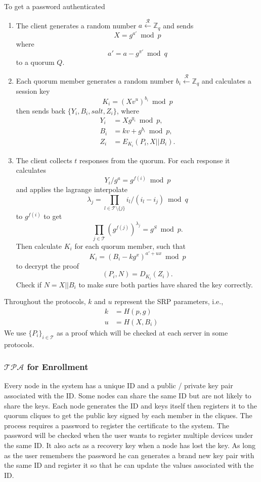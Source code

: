 To get a password authenticated
\begin{enumerate}
\item The client generates a random number
  $a \xleftarrow{\mathcal{R}} \mathbb{Z}_q$
  and sends
  \[
    X = g^{a'} \bmod p
  \]
  where
  \[
    a' = a - g^{\pi'} \bmod q
  \]
  to a quorum $Q$.
\item Each quorum member generates a random number
  $b_i \xleftarrow{\mathcal{R}} \mathbb{Z}_q$
  and calculates a session key
  \[ K_i = (Xv^u)^{b_i} \bmod p \]
  then sends back $\{Y_i, B_i, salt, Z_i\}$,
  where
  \begin{align*}
    Y_i &= X g^{y_i} \bmod p, \\
    B_i &= kv + g^{b_i} \bmod p, \\
    Z_i &= E_{K_i}(P_i, X ||B_i).
  \end{align*}
\item The client collects $t$ responses from the quorum. For each
  response it calculates
  \[
    Y_i/g^a = g^{f(i)} \bmod p
  \]
  and applies the lagrange interpolate
  \[
    \lambda_j = \prod_{l \in \mathcal{T} \setminus \{j\}}
    i_l / (i_l - i_j) \bmod q
  \]
  to $g^{f(i)}$ 
  to get
  \[
    \prod_{j \in \mathcal{T}}(g^{f(j)})^{\lambda_j} = g^S \bmod p.
  \]
  Then calculate $K_i$ for each quorum member, such that
  \[
    K_i = (B_i - kg^x)^{a'+ux} \bmod p
  \]
  to decrypt the proof
  \[
    (P_i, N) = D_{K_i}(Z_i).
  \]
  Check if $N = X||B_i$ to make sure both parties have shared the key
  correctly. 
\end{enumerate}
Throughout the protocols, $k$ and $u$ represent the SRP parameters, i.e.,
\begin{align*}
  k &= H(p, g) \\
  u &= H(X, B_i)
\end{align*}
We use $\{P_i\}_{i \in \mathcal{T}}$ as a proof which will be
checked at each server in some protocols.

\subsubsection*{$\mathcal{TPA}$ for Enrollment}
Every node in the system has a unique ID and a public / private key
pair associated with the ID. Some nodes can share the same ID but are
not likely to share the keys. Each node generates the ID and keys
itself then registers it to the quorum cliques to get the public key
signed by each member in the cliques. The process requires a password
to register the certificate to the system. The password will be checked
when the user wants to register multiple devices under the
same ID. It also acts as a recovery key when a node has lost the
key. As long as the user remembers the password he can generates a
brand new key pair with the same ID and register it so that he can
update the values associated with the ID.\\

